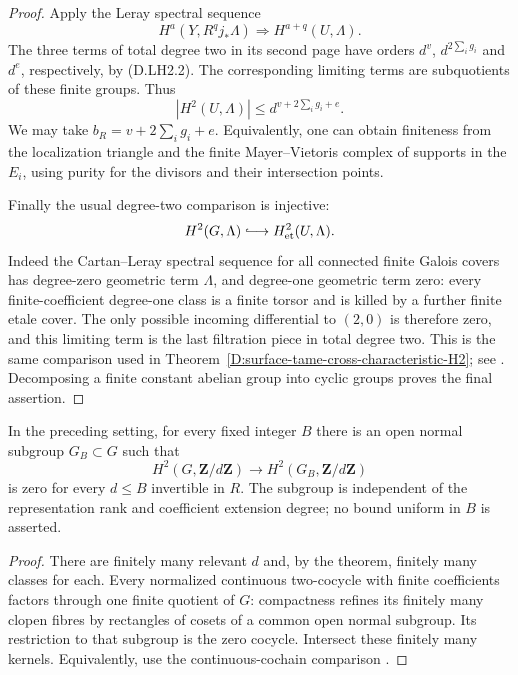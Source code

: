 \begin{proof}
Apply the Leray spectral sequence
\[
 H^a(Y,R^qj_*\Lambda)\Longrightarrow H^{a+q}(U,\Lambda).
\]
The three terms of total degree two in its second page have
orders $d^v$, $d^{2\sum_i g_i}$ and $d^e$, respectively,
by (D.LH2.2). The corresponding limiting terms are subquotients
of these finite groups. Thus
\[
                |H^2(U,\Lambda)|
                    \le d^{v+2\sum_i g_i+e}.
\]
We may take $b_R=v+2\sum_i g_i+e$. Equivalently, one can obtain
finiteness from the localization triangle and the finite
Mayer--Vietoris complex of supports in the $E_i$, using purity
for the divisors and their intersection points.

Finally the usual degree-two comparison is injective:
\[
                H^2(G,\Lambda)\lhook\joinrel\longrightarrow
                                H^2_{\mathrm{et}}(U,\Lambda).
\]
Indeed the Cartan--Leray spectral sequence for all connected
finite Galois covers has degree-zero geometric term $\Lambda$,
and degree-one geometric term zero: every finite-coefficient
degree-one class is a finite torsor and is killed by a further
finite etale cover. The only possible incoming differential
to $(2,0)$ is therefore zero, and this limiting term is the
last filtration piece in total degree two. This is the same
comparison used in
Theorem~\ref{D:surface-tame-cross-characteristic-H2}; see
\citep[Theorem~14.9, Remark~14.10 and Proposition~14.13]
{MilneLEC2013H2D}. Decomposing a finite constant abelian
group into cyclic groups proves the final assertion.
\end{proof}

\begin{corollary}
\label{D:local-bounded-central-obstructions}
In the preceding setting, for every fixed integer $B$ there
is an open normal subgroup $G_B\subset G$ such that
\[
 H^2(G,\mathbf Z/d\mathbf Z)\longrightarrow
 H^2(G_B,\mathbf Z/d\mathbf Z)
\]
is zero for every $d\le B$ invertible in $R$.
The subgroup is independent of the representation rank and
coefficient extension degree; no bound uniform in $B$ is asserted.
\end{corollary}
\begin{proof}
There are finitely many relevant $d$ and, by the theorem,
finitely many classes for each. Every normalized continuous
two-cocycle with finite coefficients factors through one
finite quotient of $G$: compactness refines its finitely
many clopen fibres by rectangles of cosets of a common open
normal subgroup. Its restriction to that subgroup is the
zero cocycle. Intersect these finitely many kernels.
Equivalently, use the continuous-cochain comparison
\citep[II, Proposition~4.2]{MilneCFT2020D}.
\end{proof}


